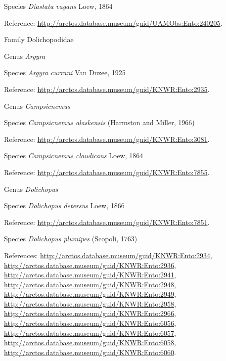 \documentclass[9pt, article]{memoir}
\begin{document}
\begin{multicols}{2}
\vspace{6pt}\noindent\hspace{36pt}Species \textit{Diastata vagans} Loew, 1864


Reference: 
\url{http://arctos.database.museum/guid/UAMObs:Ento:240205}.

\vspace{6pt}\noindent\hspace{24pt}Family Dolichopodidae


\vspace{6pt}\noindent\hspace{30pt}Genus \textit{Argyra}


\vspace{6pt}\noindent\hspace{36pt}Species \textit{Argyra currani} Van Duzee, 1925


Reference: 
\url{http://arctos.database.museum/guid/KNWR:Ento:2935}.

\vspace{6pt}\noindent\hspace{30pt}Genus \textit{Campsicnemus}


\vspace{6pt}\noindent\hspace{36pt}Species \textit{Campsicnemus alaskensis} (Harmston and Miller, 1966)


Reference: 
\url{http://arctos.database.museum/guid/KNWR:Ento:3081}.

\vspace{6pt}\noindent\hspace{36pt}Species \textit{Campsicnemus claudicans} Loew, 1864


Reference: 
\url{http://arctos.database.museum/guid/KNWR:Ento:7855}.

\vspace{6pt}\noindent\hspace{30pt}Genus \textit{Dolichopus}


\vspace{6pt}\noindent\hspace{36pt}Species \textit{Dolichopus detersus} Loew, 1866


Reference: 
\url{http://arctos.database.museum/guid/KNWR:Ento:7851}.

\vspace{6pt}\noindent\hspace{36pt}Species \textit{Dolichopus plumipes} (Scopoli, 1763)


References: 
\url{http://arctos.database.museum/guid/KNWR:Ento:2934}, 
\url{http://arctos.database.museum/guid/KNWR:Ento:2936}, 
\url{http://arctos.database.museum/guid/KNWR:Ento:2941}, 
\url{http://arctos.database.museum/guid/KNWR:Ento:2948}, 
\url{http://arctos.database.museum/guid/KNWR:Ento:2949}, 
\url{http://arctos.database.museum/guid/KNWR:Ento:2958}, 
\url{http://arctos.database.museum/guid/KNWR:Ento:2966}, 
\url{http://arctos.database.museum/guid/KNWR:Ento:6056}, 
\url{http://arctos.database.museum/guid/KNWR:Ento:6057}, 
\url{http://arctos.database.museum/guid/KNWR:Ento:6058}, 
\url{http://arctos.database.museum/guid/KNWR:Ento:6060}.


\end{multicols}
\end{document}
